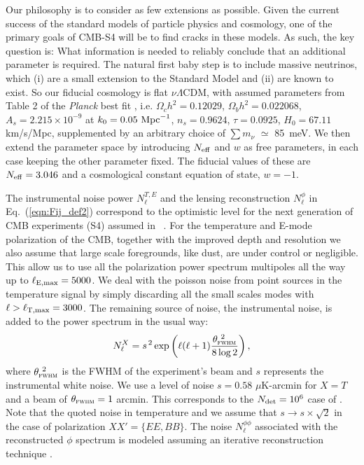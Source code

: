 \documentclass[aps,prd,reprint,superscriptaddress]{revtex4-1}
\newcommand\refeq[1]{Eq.~(\ref{eqn:#1})}
\begin{document}
Our philosophy is to consider as few extensions as possible. Given the current success of the standard models of particle physics and cosmology, one of the primary goals of CMB-S4 will be to find cracks in these models. As such, the key question is: What information is needed to reliably conclude that an additional parameter is required. The natural first baby step is to include massive neutrinos, which (i) are a small extension to the Standard Model and (ii) are known to exist. So our fiducial cosmology is flat $\nu \Lambda$CDM, with assumed 
parameters from Table 2 of the \textit{Planck} best fit \cite{planck-collaboration:2014g}, i.e. $\Omega_c h^2 = 0.12029$, $\Omega_b h^2 = 0.022068$, $A_s = 2.215\times10^{-9}$ at $k_0 = 0.05\ {\rm Mpc}^{-1}$, $n_s = 0.9624$, $\tau = 0.0925$, $H_0 = 67.11$ km/s/Mpc, supplemented by an arbitrary choice of $\sum m_\nu$ $\simeq$ 85\ meV.  
We then extend the parameter space by introducing $N_{\rm eff}$ and $w$ as free parameters, in each case keeping the other parameter fixed.
The fiducial values of these are $N_{\rm eff}=3.046$ and a cosmological constant equation of state, $w=-1$.

The instrumental noise power $N_{\ell}^{T,E}$ and the lensing reconstruction $N_{\ell}^{\phi}$ in \refeq{Fij_def2} correspond to the optimistic level for the next generation of CMB experiments (S4) assumed in ~\cite{2013arXiv1309.5383A,wu:2014,2013PhRvD..87h3008H}.
For the temperature and E-mode polarization of the CMB, together with the improved depth and resolution we also assume that large scale foregrounds, like dust, are under control or negligible. This allow us to use all the polarization power spectrum multipoles all the way up to $\ell_{\rm E,max}=5000$. We deal with the poisson noise from point sources in the temperature signal by simply discarding all the small scales modes with $\ell>\ell_{\rm T,max}=3000$.
The remaining source of noise, the instrumental noise, is added to the power spectrum in the usual way:
 \begin{equation}
 	\centering
		N^{X}_\ell = s^{\, 2} \exp \left(\ell(\ell+1) \frac{\theta^{\ 2}_{\textsc{fwhm}}}{8\log2}\right),
	\label{eq:beamnoise}
\end{equation}
where $\theta^{\ 2}_{\textsc{fwhm}}$ is the FWHM of the experiment's beam and $s$ represents the instrumental white noise.
We use a level of noise $s = 0.58$ $\mu$K-arcmin for $X=T$ and a beam of $\theta_{\textsc{fwhm}}=1$ arcmin. This corresponds to the $N_{\rm det}=10^{6}$ case of \cite{wu:2014}. 
Note that the quoted noise in temperature and we assume that $s \rightarrow s\times \sqrt{2}$ in the case of polarization $ XX' = \{ EE, BB \}$.
The noise $N_\ell^{\phi\phi}$ associated with the reconstructed $\phi$ spectrum is modeled assuming an iterative reconstruction technique \cite{seljak:2004}. 
\end{document}
